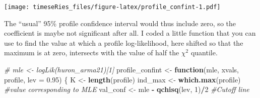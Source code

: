 \documentclass[]{book}
\newenvironment{Shaded}{\begin{snugshade}}{\end{snugshade}}
\newcommand{\CommentTok}[1]{\textcolor[rgb]{0.56,0.35,0.01}{\textit{#1}}}
\newcommand{\ControlFlowTok}[1]{\textcolor[rgb]{0.13,0.29,0.53}{\textbf{#1}}}
\newcommand{\DataTypeTok}[1]{\textcolor[rgb]{0.13,0.29,0.53}{#1}}
\newcommand{\DecValTok}[1]{\textcolor[rgb]{0.00,0.00,0.81}{#1}}
\newcommand{\FloatTok}[1]{\textcolor[rgb]{0.00,0.00,0.81}{#1}}
\newcommand{\KeywordTok}[1]{\textcolor[rgb]{0.13,0.29,0.53}{\textbf{#1}}}
\newcommand{\NormalTok}[1]{#1}
\newcommand{\OperatorTok}[1]{\textcolor[rgb]{0.81,0.36,0.00}{\textbf{#1}}}
\newcommand{\StringTok}[1]{\textcolor[rgb]{0.31,0.60,0.02}{#1}}
\begin{document}
\texttt{[image: timeseRies\_files/figure-latex/profile\_confint-1.pdf]}

The ``usual'' 95\% profile confidence interval would thus include zero,
so the coefficient is maybe not significant after all. I coded a little
function that you can use to find the value at which a profile
log-likelihood, here shifted so that the maximum is at zero, intersects
with the value of half the \(\chi^2\) quantile.

\begin{Shaded}
\begin{Highlighting}[]
\CommentTok{# mle <- logLik(huron_arma21)[1]}
\NormalTok{profile_confint <-}\StringTok{ }\ControlFlowTok{function}\NormalTok{(mle, xvals, profile, }\DataTypeTok{lev =} \FloatTok{0.95}\NormalTok{) \{}
\NormalTok{    K <-}\StringTok{ }\KeywordTok{length}\NormalTok{(profile)}
\NormalTok{    ind_max <-}\StringTok{ }\KeywordTok{which.max}\NormalTok{(profile)  }\CommentTok{#value corresponding to MLE}
\NormalTok{    val_conf <-}\StringTok{ }\NormalTok{mle }\OperatorTok{-}\StringTok{ }\KeywordTok{qchisq}\NormalTok{(lev, }\DecValTok{1}\NormalTok{)}\OperatorTok{/}\DecValTok{2}  \CommentTok{#Cutoff line}
    

\end{Highlighting}
\end{Shaded}
\end{document}
